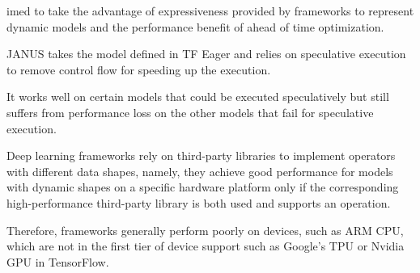 
    imed to take the advantage of expressiveness provided by frameworks to represent
    dynamic models and the performance benefit of ahead of time optimization.

    JANUS takes the model defined in TF Eager and relies on speculative execution
    to remove control flow for speeding up the execution.

    It works well on certain models that could be executed speculatively but
    still suffers from performance loss on the other models that fail for
    speculative execution.

    Deep learning frameworks rely on third-party libraries to implement
    operators with different data shapes, namely, they achieve good performance
    for models with dynamic shapes on a specific hardware platform only
    if the corresponding high-performance third-party library
    is both used and supports an operation.

    Therefore, frameworks generally perform poorly on devices,
    such as ARM CPU, which are not in the first tier of device
    support such as Google's TPU or Nvidia GPU in TensorFlow.





